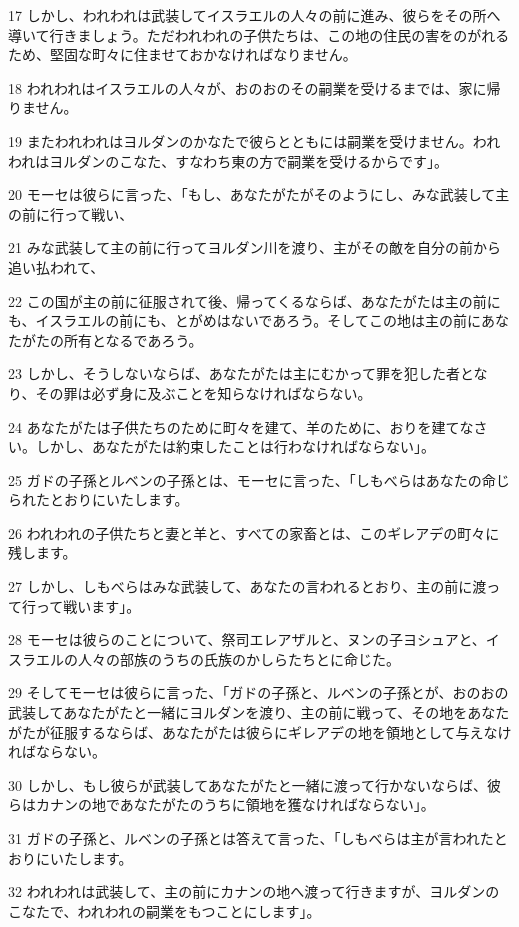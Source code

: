 \par 17 しかし、われわれは武装してイスラエルの人々の前に進み、彼らをその所へ導いて行きましょう。ただわれわれの子供たちは、この地の住民の害をのがれるため、堅固な町々に住ませておかなければなりません。
\par 18 われわれはイスラエルの人々が、おのおのその嗣業を受けるまでは、家に帰りません。
\par 19 またわれわれはヨルダンのかなたで彼らとともには嗣業を受けません。われわれはヨルダンのこなた、すなわち東の方で嗣業を受けるからです」。
\par 20 モーセは彼らに言った、「もし、あなたがたがそのようにし、みな武装して主の前に行って戦い、
\par 21 みな武装して主の前に行ってヨルダン川を渡り、主がその敵を自分の前から追い払われて、
\par 22 この国が主の前に征服されて後、帰ってくるならば、あなたがたは主の前にも、イスラエルの前にも、とがめはないであろう。そしてこの地は主の前にあなたがたの所有となるであろう。
\par 23 しかし、そうしないならば、あなたがたは主にむかって罪を犯した者となり、その罪は必ず身に及ぶことを知らなければならない。
\par 24 あなたがたは子供たちのために町々を建て、羊のために、おりを建てなさい。しかし、あなたがたは約束したことは行わなければならない」。
\par 25 ガドの子孫とルベンの子孫とは、モーセに言った、「しもべらはあなたの命じられたとおりにいたします。
\par 26 われわれの子供たちと妻と羊と、すべての家畜とは、このギレアデの町々に残します。
\par 27 しかし、しもべらはみな武装して、あなたの言われるとおり、主の前に渡って行って戦います」。
\par 28 モーセは彼らのことについて、祭司エレアザルと、ヌンの子ヨシュアと、イスラエルの人々の部族のうちの氏族のかしらたちとに命じた。
\par 29 そしてモーセは彼らに言った、「ガドの子孫と、ルベンの子孫とが、おのおの武装してあなたがたと一緒にヨルダンを渡り、主の前に戦って、その地をあなたがたが征服するならば、あなたがたは彼らにギレアデの地を領地として与えなければならない。
\par 30 しかし、もし彼らが武装してあなたがたと一緒に渡って行かないならば、彼らはカナンの地であなたがたのうちに領地を獲なければならない」。
\par 31 ガドの子孫と、ルベンの子孫とは答えて言った、「しもべらは主が言われたとおりにいたします。
\par 32 われわれは武装して、主の前にカナンの地へ渡って行きますが、ヨルダンのこなたで、われわれの嗣業をもつことにします」。
